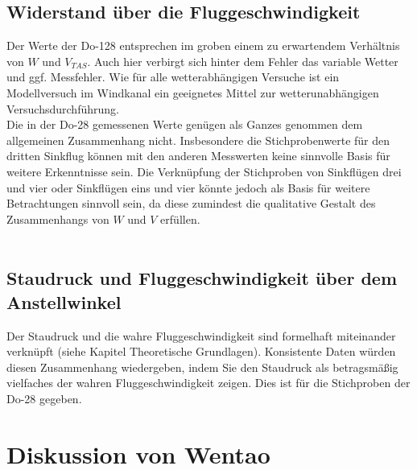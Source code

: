 \subsection{Widerstand über die Fluggeschwindigkeit}

Der Werte der Do-128 entsprechen im groben einem zu erwartendem Verhältnis von $W$ und $V_{TAS}$. Auch hier verbirgt sich hinter dem Fehler das variable Wetter und ggf. Messfehler. Wie für alle wetterabhängigen Versuche ist ein Modellversuch im Windkanal ein geeignetes Mittel zur wetterunabhängigen Versuchsdurchführung.\\
Die in der Do-28 gemessenen Werte genügen als Ganzes genommen dem allgemeinen Zusammenhang nicht. Insbesondere die Stichprobenwerte für den dritten Sinkflug können mit den anderen Messwerten keine sinnvolle Basis für weitere Erkenntnisse sein.
Die Verknüpfung der Stichproben von Sinkflügen drei und vier oder Sinkflügen eins und vier könnte jedoch als Basis für weitere Betrachtungen sinnvoll sein, da diese zumindest die qualitative Gestalt des Zusammenhangs von $W$ und $V$ erfüllen.\\\\

\subsection{Staudruck und Fluggeschwindigkeit über dem Anstellwinkel}
Der Staudruck und die wahre Fluggeschwindigkeit sind formelhaft miteinander verknüpft (siehe Kapitel Theoretische Grundlagen). Konsistente Daten würden diesen Zusammenhang wiedergeben, indem Sie den Staudruck als betragsmäßig vielfaches der wahren Fluggeschwindigkeit zeigen. Dies ist für die Stichproben der Do-28 gegeben.
\newpage

\section{Diskussion von Wentao}
\newpage